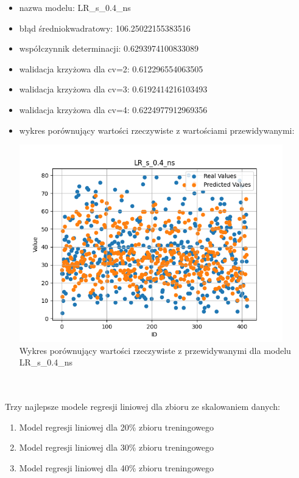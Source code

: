 \documentclass[11pt, a4paper, notitlepage]{report}
\begin{document}
\begin{itemize}
	\item nazwa modelu: LR\_s\_0.4\_ns
	\item błąd średniokwadratowy: 106.25022155383516
	\item współczynnik determinacji: 0.6293974100833089
	\item walidacja krzyżowa dla cv=2: 0.612296554063505
	\item walidacja krzyżowa dla cv=3: 0.6192414216103493
	\item walidacja krzyżowa dla cv=4: 0.6224977912969356
	\item wykres porównujący wartości rzeczywiste z wartościami przewidywanymi: \begin{center} \small
		\includegraphics[width=0.9\textwidth]{graphics/plots/LR_s_0.4_ns.png} \\
		\caption{Wykres porównujący wartości rzeczywiste z przewidywanymi dla modelu LR\_s\_0.4\_ns}
	\end{center}
	\end{itemize}
\\ \\
Trzy najlepsze modele regresji liniowej dla zbioru ze skalowaniem danych:
\begin{enumerate}
	\item Model regresji liniowej dla 20\% zbioru treningowego
	\item Model regresji liniowej dla 30\% zbioru treningowego
	\item Model regresji liniowej dla 40\% zbioru treningowego
\end{enumerate}
\\ \\
\end{document}

